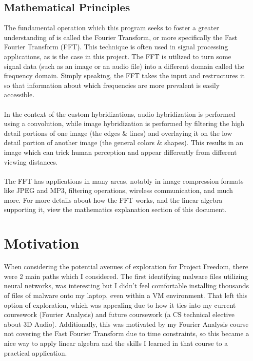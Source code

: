 \documentclass[notitlepage]{article}
\begin{document}
\subsection{Mathematical Principles}

The fundamental operation which this program seeks to
foster a greater understanding of is called the Fourier
Transform, or more specifically the Fast Fourier Transform (FFT).
This technique is often used in signal processing applications,
as is the case in this project. The FFT is utilized to turn some
signal data (such as an image or an audio file) into a different domain
called the frequency domain. Simply speaking, the FFT takes the input and
restructures it so that information about which frequencies are more prevalent
is easily accessible.
\\\\
In the context of the custom hybridizations, audio hybridization is performed using
a convolution, while image hybridization is performed by filtering the high detail portions
of one image (the edges \& lines) and overlaying it on the low detail portion of another
image (the general colors \& shapes). This results in an image which can trick human perception
and appear differently from different viewing distances.
\\\\
The FFT has applications in many areas, notably in image compression formats
like JPEG and MP3, filtering operations, wireless communication, and much more.
For more details about how the FFT works, and the linear algebra supporting it,
view the mathematics explanation section of this document.

\section{Motivation}

When considering the potential avenues of exploration for Project Freedom, there were
2 main paths which I considered. The first identifying malware files utilizing neural networks,
was interesting but I didn't feel comfortable installing thousands of files of malware onto my
laptop, even within a VM environment. That left this option of exploration, which was appealing
due to how it ties into my current coursework (Fourier Analysis) and future coursework
(a CS technical elective about 3D Audio). Additionally, this was motivated by my Fourier Analysis
course not covering the Fast Fourier Transform due to time constraints, so this became a nice
way to apply linear algebra and the skills I learned in that course to a practical application.
\end{document}
